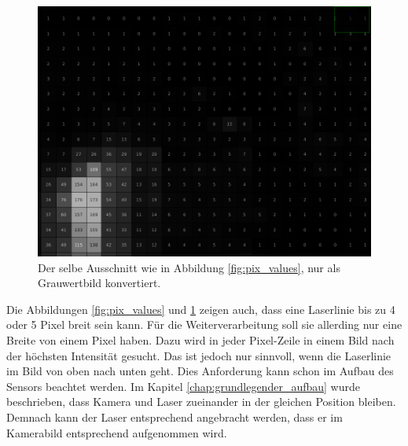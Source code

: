 	\begin{figure}[h]
		\centering
		\includegraphics[width=0.75\linewidth]{img/hauptteil/bildverarbeitung/pixel_values_gray.png}
		\caption{Der selbe Ausschnitt wie in Abbildung \ref{fig:pix_values}, nur als Grauwertbild konvertiert.}
		\label{fig:pix_values_gray}
	\end{figure} 
	
	Die Abbildungen \ref{fig:pix_values} und \ref{fig:pix_values_gray} zeigen auch, dass eine Laserlinie bis zu 4 oder 5 Pixel breit sein kann. Für die Weiterverarbeitung soll sie allerding nur eine Breite von einem Pixel haben. Dazu wird in jeder Pixel-Zeile in einem Bild nach der höchsten Intensität gesucht. Das ist jedoch nur sinnvoll, wenn die Laserlinie im Bild von oben nach unten geht. Dies Anforderung kann schon im Aufbau des Sensors beachtet werden. Im Kapitel \ref{chap:grundlegender_aufbau} wurde beschrieben, dass Kamera und Laser zueinander in der gleichen Position bleiben. Demnach kann der Laser entsprechend angebracht werden, dass er im Kamerabild entsprechend aufgenommen wird.
	
